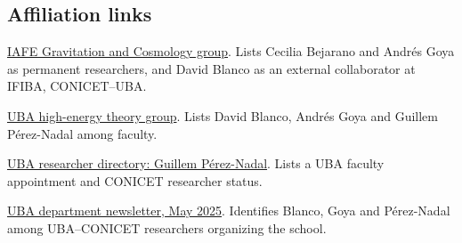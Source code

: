 \documentclass[12pt,a4paper]{article}
\begin{document}
\subsection*{Affiliation links}
\href{https://www.iafe.uba.ar/relatividad/gravity.html}{IAFE Gravitation and Cosmology group}. Lists Cecilia Bejarano and Andrés Goya as permanent researchers, and David Blanco as an external collaborator at IFIBA, CONICET--UBA.\par
\href{https://wp.df.uba.ar/hepth/people/}{UBA high-energy theory group}. Lists David Blanco, Andrés Goya and Guillem Pérez-Nadal among faculty.\par
\href{https://df.uba.ar/es/investigadores1/investigadores-y-becarios/miembro/75-Guillem_Perez_Nadal}{UBA researcher directory: Guillem Pérez-Nadal}. Lists a UBA faculty appointment and CONICET researcher status.\par
\href{https://www.df.uba.ar/attachments/article/8731/Newsletter%20mayo%202025.pdf}{UBA department newsletter, May 2025}. Identifies Blanco, Goya and Pérez-Nadal among UBA--CONICET researchers organizing the school.\par
\end{document}

